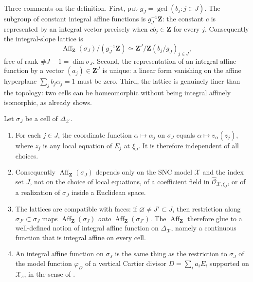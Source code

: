 Three comments on the definition. First, put
$g_J=\gcd(b_j:j\in J)$.  The subgroup of constant integral affine
functions is $g_J^{-1}\mathbf Z$: the constant $c$ is represented by
an integral vector precisely when $cb_j\in\mathbf Z$ for every $j$.
Consequently the integral-slope lattice is
\[
 \operatorname{Aff}_{\mathbf Z}(\sigma_J)/(g_J^{-1}\mathbf Z)
 \simeq \mathbf Z^J/\mathbf Z(b_j/g_J)_{j\in J},
\]
free of rank $\#J-1=\dim\sigma_J$. Second, the representation of an
integral affine function by a vector $(a_j)\in\mathbf Z^J$ is unique:
a linear form vanishing on the affine hyperplane
$\sum_jb_j\alpha_j=1$ must be zero. Third, the
lattice is genuinely finer than the topology: two cells can be homeomorphic
without being integral affinely isomorphic, as
 already shows.

\begin{proposition}
\label{prop:integral-affine-intrinsic}
Let $\sigma_J$ be a cell of $\Delta_{\mathcal X}$.
\begin{enumerate}
\item For each $j\in J$, the coordinate function $\alpha\mapsto\alpha_j$
  on $\sigma_J$ equals $\alpha\mapsto v_\alpha(z_j)$, where $z_j$ is
  any local equation of $E_j$ at $\xi_J$. It is therefore independent of
  all choices.
\item Consequently $\operatorname{Aff}_{\mathbf Z}(\sigma_J)$ depends only on the SNC
  model $\mathcal X$ and the index set $J$, not on the choice of local
  equations, of a coefficient field in
  $\widehat{\mathcal O}_{\mathcal X,\xi_J}$, or of a realization of
  $\sigma_J$ inside a Euclidean space.
\item The lattices are compatible with faces: if
  $\varnothing\neq J'\subset J$, then restriction along
  $\sigma_{J'}\subset\sigma_J$ maps $\operatorname{Aff}_{\mathbf Z}(\sigma_J)$
  \emph{onto} $\operatorname{Aff}_{\mathbf Z}(\sigma_{J'})$. The $\operatorname{Aff}_{\mathbf Z}$
  therefore glue to a well-defined notion of integral affine function on
  $\Delta_{\mathcal X}$, namely a continuous function that is integral
  affine on every cell.
\item An integral affine function on $\sigma_J$ is the same thing as the
  restriction to $\sigma_J$ of the model function $\varphi_D$ of a
  vertical Cartier divisor $D=\sum_ia_iE_i$ supported on $\mathcal X_s$,
  in the sense of .
\end{enumerate}
\end{proposition}

